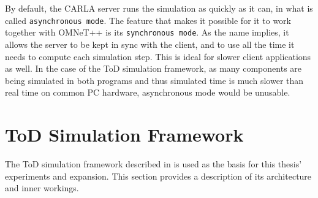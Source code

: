 By default, the CARLA server runs the simulation as quickly as it can, in what is called \texttt{asynchronous mode}. The feature that makes it possible for it to work together with OMNeT++ is its \texttt{synchronous mode}.
As the name implies, it allows the server to be kept in sync with the client, and to use all the time it needs to compute each simulation step. This is ideal for slower client applications as well. In the case of the ToD simulation framework, as many components are being simulated in both programs and thus simulated time is much slower than real time on common PC hardware, asynchronous mode would be unusable.



\section{ToD Simulation Framework}



The ToD simulation framework described in \cite{valeriopaper} is used as the basis for this thesis' experiments and expansion. This section provides a description of its architecture and inner workings.

